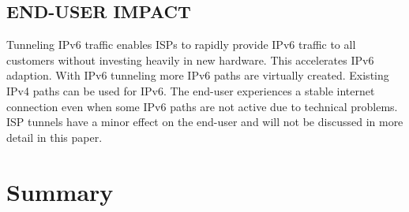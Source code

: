 \documentclass[format=sigconf, natbib=true, nonacm=true]{acmart}
\begin{document}
    \subsection*{END-USER IMPACT}
    Tunneling IPv6 traffic enables ISPs to rapidly provide IPv6 traffic to all customers without investing heavily in new hardware. This accelerates IPv6 adaption. With IPv6 tunneling more IPv6 paths are virtually created. Existing IPv4 paths can be used for IPv6. The end-user experiences a stable internet connection even when some IPv6 paths are not active due to technical problems. ISP tunnels have a minor effect on the end-user and will not be discussed in more detail in this paper.

    \section{Summary}
\end{document}
